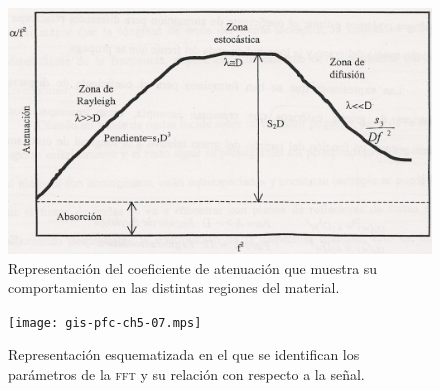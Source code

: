 \documentclass[a4paper,12pt]				{article}
\begin{document}
\begin{figure}
	\begin{center}
		\includegraphics{gis-pfc-ch5-06.jpg}
	\end{center}
	\caption[Comportamiento del coeficiente de
	atenuación]{Representación del coeficiente de atenuación que
	muestra su comportamiento en las distintas regiones del material.}
	\label{fig:losscoefficient}
\end{figure}

\begin{figure}
	\begin{center}
		\texttt{[image: gis-pfc-ch5-07.mps]}
	\end{center}
	\caption[Parámetros del banco de filtros]{Representación
	esquematizada en el que se identifican los parámetros de la
	\textsc{fft} y su relación con respecto a la señal.}
	\label{fig:filter}
\end{figure}

% 
\end{document}
